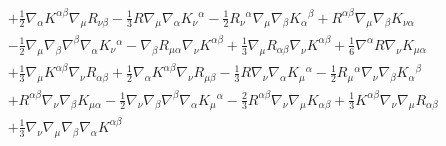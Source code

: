 \documentclass[10pt,letterpaper]{article}
\numberwithin{equation}{section}
\begin{document}
\begin{eqnarray}
&& + \tfrac{1}{2} \nabla_{\alpha }K^{\alpha \beta } \nabla_{\mu }R_{\nu \beta } -  \tfrac{1}{3} R \nabla_{\mu }\nabla_{\alpha }K_{\nu }{}^{\alpha } -  \tfrac{1}{2} R_{\nu }{}^{\alpha } \nabla_{\mu }\nabla_{\beta }K_{\alpha }{}^{\beta } + R^{\alpha \beta } \nabla_{\mu }\nabla_{\beta }K_{\nu \alpha } \nonumber \\ 
&& -  \tfrac{1}{2} \nabla_{\mu }\nabla_{\beta }\nabla^{\beta }\nabla_{\alpha }K_{\nu }{}^{\alpha } -  \nabla_{\beta }R_{\mu \alpha } \nabla_{\nu }K^{\alpha \beta } + \tfrac{1}{3} \nabla_{\mu }R_{\alpha \beta } \nabla_{\nu }K^{\alpha \beta } + \tfrac{1}{6} \nabla^{\alpha }R \nabla_{\nu }K_{\mu \alpha } \nonumber \\ 
&& + \tfrac{1}{3} \nabla_{\mu }K^{\alpha \beta } \nabla_{\nu }R_{\alpha \beta } + \tfrac{1}{2} \nabla_{\alpha }K^{\alpha \beta } \nabla_{\nu }R_{\mu \beta } -  \tfrac{1}{3} R \nabla_{\nu }\nabla_{\alpha }K_{\mu }{}^{\alpha } -  \tfrac{1}{2} R_{\mu }{}^{\alpha } \nabla_{\nu }\nabla_{\beta }K_{\alpha }{}^{\beta } \nonumber \\ 
&& + R^{\alpha \beta } \nabla_{\nu }\nabla_{\beta }K_{\mu \alpha } -  \tfrac{1}{2} \nabla_{\nu }\nabla_{\beta }\nabla^{\beta }\nabla_{\alpha }K_{\mu }{}^{\alpha } -  \tfrac{2}{3} R^{\alpha \beta } \nabla_{\nu }\nabla_{\mu }K_{\alpha \beta } + \tfrac{1}{3} K^{\alpha \beta } \nabla_{\nu }\nabla_{\mu }R_{\alpha \beta } \nonumber \\ 
&& + \tfrac{1}{3} \nabla_{\nu }\nabla_{\mu }\nabla_{\beta }\nabla_{\alpha }K^{\alpha \beta }
\label{dw54rw}
\end{eqnarray}
%
%
\end{document}
